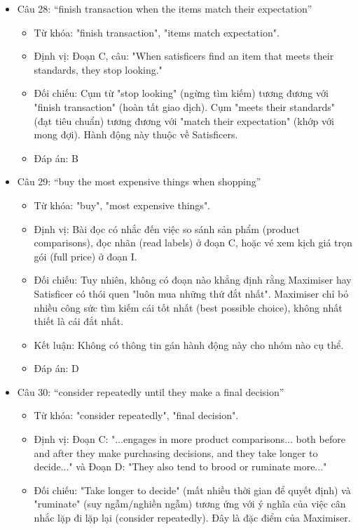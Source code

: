 \documentclass{../templateReading/cdreading}
\begin{document}
\begin{itemize}
\item Câu 28: “finish transaction when the items match their expectation”
\begin{itemize}
\item Từ khóa: "finish transaction", "items match expectation".
\item Định vị: Đoạn C, câu: "When satisficers find an item that meets their standards, they stop looking."
\item Đối chiếu: Cụm từ "stop looking" (ngừng tìm kiếm) tương đương với "finish transaction" (hoàn tất giao dịch). Cụm "meets their standards" (đạt tiêu chuẩn) tương đương với "match their expectation" (khớp với mong đợi). Hành động này thuộc về Satisficers.
\item Đáp án: B
\end{itemize}
\item Câu 29: “buy the most expensive things when shopping”
\begin{itemize}
\item Từ khóa: "buy", "most expensive things".
\item Định vị: Bài đọc có nhắc đến việc so sánh sản phẩm (product comparisons), đọc nhãn (read labels) ở đoạn C, hoặc vé xem kịch giá trọn gói (full price) ở đoạn I.
\item Đối chiếu: Tuy nhiên, không có đoạn nào khẳng định rằng Maximiser hay Satisficer có thói quen "luôn mua những thứ đắt nhất". Maximiser chỉ bỏ nhiều công sức tìm kiếm cái tốt nhất (best possible choice), không nhất thiết là cái đắt nhất.
\item Kết luận: Không có thông tin gán hành động này cho nhóm nào cụ thể.
\item Đáp án: D
\end{itemize}
\item Câu 30: “consider repeatedly until they make a final decision”
\begin{itemize}
\item Từ khóa: "consider repeatedly", "final decision".
\item Định vị: Đoạn C: "...engages in more product comparisons... both before and after they make purchasing decisions, and they take longer to decide..." và Đoạn D: "They also tend to brood or ruminate more..."
\item Đối chiếu: "Take longer to decide" (mất nhiều thời gian để quyết định) và "ruminate" (suy ngẫm/nghiền ngẫm) tương ứng với ý nghĩa của việc cân nhắc lặp đi lặp lại (consider repeatedly). Đây là đặc điểm của Maximiser.

\end{itemize}
\end{itemize}
\end{document}

